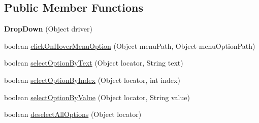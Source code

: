 \subsection*{Public Member Functions}
\begin{DoxyCompactItemize}
\item 
\hypertarget{classcom_1_1zeuslearning_1_1automation_1_1selenium_1_1interactions_1_1DropDown_a436e7df72048fe9582ee15bd0d5c8eee}{}\label{classcom_1_1zeuslearning_1_1automation_1_1selenium_1_1interactions_1_1DropDown_a436e7df72048fe9582ee15bd0d5c8eee} 
{\bfseries Drop\+Down} (Object driver)
\item 
boolean \hyperlink{classcom_1_1zeuslearning_1_1automation_1_1selenium_1_1interactions_1_1DropDown_ab27460ee736614dfc1c93b57b98aadc2}{click\+On\+Hover\+Menu\+Option} (Object menu\+Path, Object menu\+Option\+Path)
\item 
boolean \hyperlink{classcom_1_1zeuslearning_1_1automation_1_1selenium_1_1interactions_1_1DropDown_aa7c95fbe76e90d922c20459d6917e57e}{select\+Option\+By\+Text} (Object locator, String text)
\item 
boolean \hyperlink{classcom_1_1zeuslearning_1_1automation_1_1selenium_1_1interactions_1_1DropDown_a90eaa639ff1980274aa7e27a29ad7230}{select\+Option\+By\+Index} (Object locator, int index)
\item 
boolean \hyperlink{classcom_1_1zeuslearning_1_1automation_1_1selenium_1_1interactions_1_1DropDown_a192726c41689be2fd5ee44ad49262950}{select\+Option\+By\+Value} (Object locator, String value)
\item 
boolean \hyperlink{classcom_1_1zeuslearning_1_1automation_1_1selenium_1_1interactions_1_1DropDown_aaf41adc5687eae5fd1980fa34b583a5f}{deselect\+All\+Options} (Object locator)
\end{DoxyCompactItemize}

